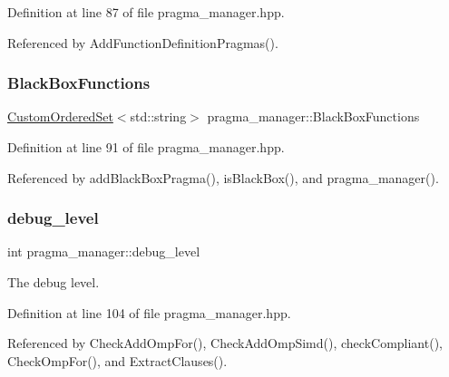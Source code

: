 Definition at line 87 of file pragma\+\_\+manager.\+hpp.



Referenced by Add\+Function\+Definition\+Pragmas().

\mbox{\label{classpragma__manager_aeae9103176fef8fee3a63b81cfec4342}} 
\subsubsection{\texorpdfstring{Black\+Box\+Functions}{BlackBoxFunctions}}
{\footnotesize\ttfamily \hyperlink{classCustomOrderedSet}{Custom\+Ordered\+Set}$<$std\+::string$>$ pragma\+\_\+manager\+::\+Black\+Box\+Functions\hspace{0.3cm}{\ttfamily [protected]}}



Definition at line 91 of file pragma\+\_\+manager.\+hpp.



Referenced by add\+Black\+Box\+Pragma(), is\+Black\+Box(), and pragma\+\_\+manager().

\mbox{\label{classpragma__manager_af085dbf522ddedf4915997f9a70af0c2}} 
\subsubsection{\texorpdfstring{debug\+\_\+level}{debug\_level}}
{\footnotesize\ttfamily int pragma\+\_\+manager\+::debug\+\_\+level\hspace{0.3cm}{\ttfamily [protected]}}



The debug level. 



Definition at line 104 of file pragma\+\_\+manager.\+hpp.



Referenced by Check\+Add\+Omp\+For(), Check\+Add\+Omp\+Simd(), check\+Compliant(), Check\+Omp\+For(), and Extract\+Clauses().

\mbox{\label{classpragma__manager_a4c03019c24eb4b9a588be390749d8d69}} 
